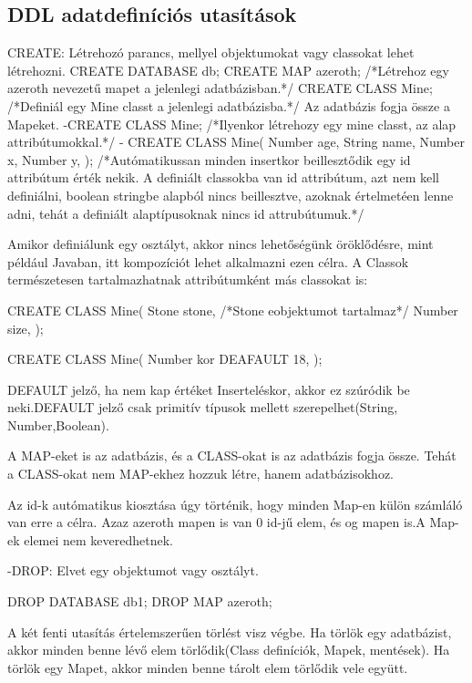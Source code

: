 \begin{sql}
\section{DDL adatdefiníciós utasítások}

CREATE: Létrehozó parancs, mellyel objektumokat vagy classokat lehet létrehozni.
CREATE DATABASE db;
CREATE MAP azeroth; /*Létrehoz egy azeroth nevezetű mapet a jelenlegi adatbázisban.*/
CREATE CLASS Mine; /*Definiál egy Mine classt a jelenlegi adatbázisba.*/
Az adatbázis fogja össze a Mapeket. 
-CREATE CLASS Mine; /*Ilyenkor létrehozy egy mine classt, az alap attribútumokkal.*/
- CREATE CLASS Mine(
	Number age,
	String name,
	Number x,
	Number y,
);  /*Autómatikussan minden insertkor beillesztődik egy id attribútum érték nekik. A definiált classokba van id attribútum, azt nem kell definiálni, boolean stringbe alapból nincs beillesztve, azoknak értelmetéen lenne adni, tehát a definiált alaptípusoknak nincs id attrubútumuk.*/

Amikor definiálunk egy osztályt, akkor nincs lehetőségünk öröklődésre, mint például Javaban, itt kompozíciót lehet alkalmazni ezen célra.
A Classok természetesen tartalmazhatnak attribútumként más classokat is:

\begin{sql}
CREATE CLASS Mine(
	Stone stone,  /*Stone eobjektumot tartalmaz*/
	Number size,
);

CREATE CLASS Mine(
	Number kor DEAFAULT 18,
);
\end{sql}

DEFAULT jelző, ha nem kap értéket Inserteléskor, akkor ez szúródik be neki.DEFAULT jelző csak primitív típusok mellett szerepelhet(String, Number,Boolean).

A MAP-eket is az adatbázis, és a CLASS-okat is az adatbázis fogja össze. Tehát a CLASS-okat nem MAP-ekhez hozzuk létre, hanem adatbázisokhoz.

Az id-k autómatikus kiosztása úgy történik, hogy minden Map-en külön számláló van erre a célra. Azaz azeroth mapen is van 0 id-jű elem, és og mapen is.A Map-ek elemei nem keveredhetnek.


-DROP: Elvet egy objektumot vagy osztályt.
\begin{sql}
DROP DATABASE db1;
DROP MAP azeroth;
\end{sql}
A két fenti utasítás értelemszerűen törlést visz végbe. Ha törlök egy adatbázist, akkor minden benne lévő elem törlődik(Class definíciók, Mapek, mentések).
Ha törlök  egy Mapet, akkor minden benne tárolt elem törlődik vele együtt.


\end{sql}
